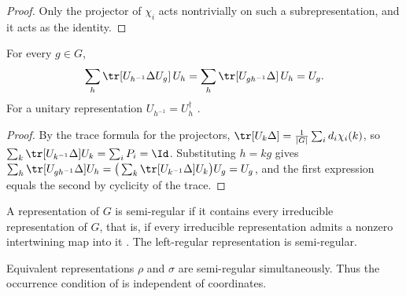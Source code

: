 \begin{proof}\leanok
    Only the projector of $\chi_i$ acts nontrivially on such a
    subrepresentation, and it acts as the identity.
\end{proof}

\begin{lemma}%
    \label{thm:peps_delta_expansion}
    \leanok
    For every $g\in G$,
    \begin{align*}
        \sum_h\tr[U_{h^{-1}}\Delta U_g]\,U_h
        =\sum_h\tr[U_{gh^{-1}}\Delta]\,U_h=U_g .
    \end{align*}
    For a unitary representation $U_{h^{-1}}=U_h^\dagger$
    \cite[Section~``MPS: the $G$-injective case'']{Schuch2010PEPS}.
\end{lemma}

\begin{proof}\leanok
    By the trace formula for the projectors,
    $\tr[U_k\Delta]=\frac{1}{|G|}\sum_i d_i\chi_i(k)$, so
    $\sum_k\tr[U_{k^{-1}}\Delta]U_k=\sum_iP_i=\Id$. Substituting
    $h=kg$ gives
    $\sum_h\tr[U_{gh^{-1}}\Delta]U_h=\big(\sum_k\tr[U_{k^{-1}}\Delta]U_k\big)U_g
        =U_g$, and the first expression equals the second by cyclicity of
    the trace.
\end{proof}

\begin{definition}%
    \label{def:peps_semiregular}
    \leanok
    A representation of $G$ is semi-regular if it contains every irreducible
    representation of $G$, that is, if every irreducible representation
    admits a nonzero intertwining map into it
    \cite[Section~``MPS: the $G$-injective case'']{Schuch2010PEPS}. The
    left-regular representation is semi-regular.
\end{definition}

\begin{lemma}%
    \label{thm:peps_semiregular_equivalence}
    \leanok
    Equivalent representations $\rho$ and $\sigma$ are semi-regular
    simultaneously. Thus the occurrence condition of
    \cite[Definition~4.5]{Schuch2010PEPS} is independent of coordinates.
\end{lemma}


